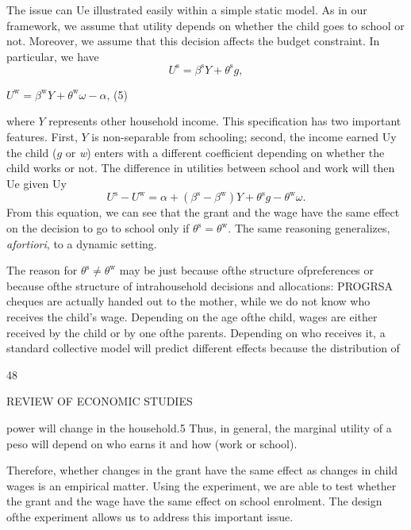 The issue can Ue illustrated easily within a simple static model. As in our framework, we assume that utility depends on whether the child goes to school or not. Moreover, we assume that this decision affects the budget constraint. In particular, we have
$$
U^{\mathrm{s}}=\beta^{\mathrm{s}}Y+\theta^{\mathrm{s}}g,
$$
\begin{center}
$ U^{\mathrm{w}}=\beta^{\mathrm{w}}Y+\theta^{\mathrm{w}}\omega-\alpha$,   (5)
\end{center}
where $Y$ represents other household income. This specification has two important features. First, $Y$ is non-separable from schooling; second, the income earned Uy the child ($g$ or {\it w}) enters with a different coefficient depending on whether the child works or not. The difference in utilities between school and work will then Ue given Uy
$$
U^{\mathrm{s}}-U^{\mathrm{w}}=\alpha+(\beta^{\mathrm{s}}-\beta^{\mathrm{w}})Y+\theta^{\mathrm{s}}g-\theta^{\mathrm{w}}\omega.
$$
From this equation, we can see that the grant and the wage have the same effect on the decision to go to school only if $\theta^{\mathrm{s}}=\theta^{\mathrm{w}}$. The same reasoning generalizes, {\it afortiori}, to a dynamic setting.

The reason for $\theta^{\mathrm{s}}\neq\theta^{\mathrm{w}}$ may be just because ofthe structure ofpreferences or because ofthe structure of intrahousehold decisions and allocations: PROGRSA cheques are actually handed out to the mother, while we do not know who receives the child's wage. Depending on the age ofthe child, wages are either received by the child or by one ofthe parents. Depending on who receives it, a standard collective model will predict different effects because the distribution of

48

REVIEW OF ECONOMIC STUDIES

power will change in the household.5 Thus, in general, the marginal utility of a peso will depend on who earns it and how (work or school).

Therefore, whether changes in the grant have the same effect as changes in child wages is an empirical matter. Using the experiment, we are able to test whether the grant and the wage have the same effect on school enrolment. The design ofthe experiment allows us to address this important issue.

